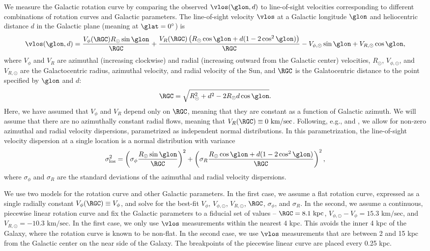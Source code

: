 We measure the Galactic rotation curve by comparing the observed $\vlos(\glon, d)$ to line-of-sight velocities corresponding to different combinations of rotation curves and Galactic parameters. 
The line-of-sight velocity $\vlos$ at a Galactic longitude $\glon$ and heliocentric distance $d$ in the Galactic plane (meaning at $\glat=0^\circ$) is 
\begin{equation}
\label{eqn:vlos_mean}
\vlos(\glon, d) = \frac{V_\phi (\RGC) R_\odot \sin\glon}{\RGC} + 
\frac{V_R (\RGC) \left(R_\odot \cos \glon + d (1 - 2 \cos^2 \glon)  \right) }{\RGC} - V_{\phi, \odot} \sin \glon + V_{R, \odot} \cos \glon,
\end{equation}
where $V_\phi$ and $V_R$ are azimuthal (increasing clockwise) and radial (increasing outward from the Galactic center) velocities, $R_\odot$, $V_{\phi, \odot}$, and $V_{R, \odot}$ are the Galactocentric radius, azimuthal velocity, and radial velocity of the Sun, and $\RGC$ is the Galatocentric distance to the point specified by $\glon$ and $d$:
\begin{equation}
\RGC = \sqrt{R^2_\odot + d^2 - 2 R_\odot d \cos \glon}.
\end{equation}
Here, we have assumed that $V_\phi$ and $V_R$ depend only on $\RGC$, meaning that they are constant as a function of Galactic azimuth.
We will assume that there are no azimuthally constant radial flows, meaning that $V_R(\RGC) \equiv 0\text{ km/sec}$.
Following, e.g., \citet{Reid:2009jb} and \citet{Bovy_2009}, we allow for non-zero azimuthal and radial velocity dispersions, parametrized as independent normal distributions. 
In this parametrization, the line-of-sight velocity dispersion at a single location is a normal distribution with variance
\begin{equation}
\label{eqn:vlos_var}
\sigma^2_\mathrm{los} = \left(\sigma_\phi \frac{R_\odot \sin \glon}{\RGC} \right)^2 + 
\left(\sigma_R  \frac{R_\odot \cos \glon + d (1 - 2 \cos^2 \glon)}{\RGC} \right)^2,
\end{equation}
where $\sigma_\phi$ and $\sigma_R$ are the standard deviations of the azimuthal and radial velocity dispersions. 

We use two models for the rotation curve and other Galactic parameters. 
In the first case, we assume a flat rotation curve, expressed as a single radially constant $V_\phi(\RGC) \equiv V_\phi$, and solve for the best-fit $V_\phi$, $V_{\phi, \odot}$, $V_{R, \odot}$, $\RGC$, $\sigma_\phi$, and $\sigma_R$. 
In the second, we assume a continuous, piecewise linear rotation curve and fix the Galactic parameters to a fiducial set of values -- $\RGC = 8.1\text{ kpc}$, $V_{\phi, \odot} - V_{\phi} = 15.3 \text{ km/sec}$, and $V_{R, \odot} = - 10.3 \text{ km/sec}$. 
In the first case, we only use $\vlos$ measurements within the nearest 4 kpc.
This avoids the inner 4 kpc of the Galaxy, where the rotation curve is known to be non-flat.
In the second case, we use $\vlos$ measurements that are between 2 and 15 kpc from the Galactic center on the near side of the Galaxy. 
The breakpoints of the piecewise linear curve are placed every 0.25 kpc.

